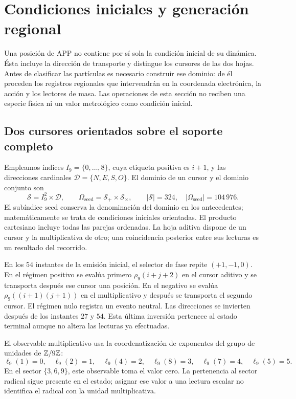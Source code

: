\section{Condiciones iniciales y generación regional}
\label{vi:reg:seccion}\label{sec:extension}\label{sec:generacion}

Una posición de APP no contiene por sí sola la condición inicial de su
dinámica. Ésta incluye la dirección de transporte y distingue los cursores
de las dos hojas. Antes de clasificar las partículas es necesario
construir ese dominio: de él proceden los registros regionales que
intervendrán en la coordenada electrónica, la acción y los lectores de
masa. Las operaciones de esta sección no reciben una especie física ni
un valor metrológico como condición inicial.

\subsection{Dos cursores orientados sobre el soporte completo}

Empleamos índices \(I_9=\{0,\ldots,8\}\), cuya etiqueta positiva es
\(i+1\), y las direcciones cardinales \(\mathcal D=\{N,E,S,O\}\).
El dominio de un cursor y el dominio conjunto son
\begin{equation}
 \mathcal S=I_9^2\times\mathcal D,\qquad
 \Omega_{\mathrm{seed}}=\mathcal S_+\times\mathcal S_\times,
 \qquad |\mathcal S|=324,\quad
 |\Omega_{\mathrm{seed}}|=104\,976.
 \label{eq:semillas}
\end{equation}
El subíndice \(\mathrm{seed}\) conserva la denominación del dominio en
los antecedentes; matemáticamente se trata de condiciones iniciales
orientadas. El producto cartesiano incluye todas las parejas ordenadas.
La hoja aditiva dispone de un cursor y la multiplicativa de otro; una
coincidencia posterior entre sus lecturas es un resultado del recorrido.

En los \(54\) instantes de la emisión inicial, el selector de fase
repite \((+1,-1,0)\). En el régimen positivo se evalúa primero
\(\rho_9(i+j+2)\) en el cursor aditivo y se transporta después ese
cursor una posición. En el negativo se evalúa
\(\rho_9((i+1)(j+1))\) en el multiplicativo y después se transporta
el segundo cursor. El régimen nulo registra un evento neutral. Las
direcciones se invierten después de los instantes \(27\) y \(54\).
Esta última inversión pertenece al estado terminal aunque no altera
las lecturas ya efectuadas.

El observable multiplicativo usa la coordenatización de exponentes del grupo de
unidades de \(\mathbb Z/9\mathbb Z\):
\[
 \ell_9(1)=0,\quad\ell_9(2)=1,\quad\ell_9(4)=2,\quad
 \ell_9(8)=3,\quad\ell_9(7)=4,\quad\ell_9(5)=5.
\]
En el sector \(\{3,6,9\}\), este observable toma el valor cero.
La pertenencia al sector radical sigue presente en el estado; asignar
ese valor a una lectura escalar no identifica el radical con la unidad
multiplicativa.

